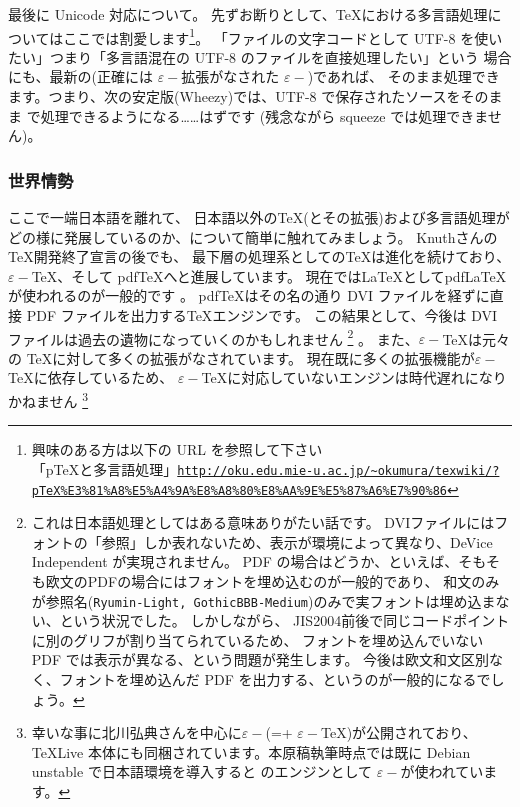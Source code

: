 \documentclass[mingoth,a4paper]{jsarticle}
\begin{document}
最後に Unicode 対応について。
先ずお断りとして、{\TeX}における多言語処理についてはここでは割愛します\footnote{
  興味のある方は以下の URL を参照して下さい\\
  「pTeXと多言語処理」{\tt{\url{http://oku.edu.mie-u.ac.jp/~okumura/texwiki/?pTeX\%E3\%81\%A8\%E5\%A4\%9A\%E8\%A8\%80\%E8\%AA\%9E\%E5\%87\%A6\%E7\%90\%86}}}
}。
%
「ファイルの文字コードとして UTF-8 を使いたい」つまり「多言語混在の UTF-8 のファイルを直接処理したい」という
場合にも、最新の{\pLaTeX}(正確には $\varepsilon-$拡張がなされた $\varepsilon-$\pTeX)であれば、
そのまま処理できます。つまり、次の安定版(Wheezy)では、UTF-8 で保存されたソースをそのまま \pLaTeX で処理できるようになる……はずです%
(残念ながら squeeze では処理できません)。

\subsubsection{世界情勢}

ここで一端日本語を離れて、
日本語以外の{\TeX}(とその拡張)および多言語処理がどの様に発展しているのか、について簡単に触れてみましょう。
%
Knuthさんの{\TeX}開発終了宣言の後でも、
最下層の処理系としての{\TeX}は進化を続けており、$\varepsilon-$\TeX、そして pdf\TeX へと進展しています。
現在では{\LaTeX}として{pdf\LaTeX}が使われるのが一般的です
。
pdf{\TeX}はその名の通り DVI ファイルを経ずに直接 PDF ファイルを出力する{\TeX}エンジンです。
この結果として、今後は DVI ファイルは過去の遺物になっていくのかもしれません
\footnote{
  これは日本語処理としてはある意味ありがたい話です。
  DVIファイルにはフォントの「参照」しか表れないため、表示が環境によって異なり、DeVice Independent が実現されません。
  PDF の場合はどうか、といえば、そもそも欧文のPDFの場合にはフォントを埋め込むのが一般的であり、
  和文のみが参照名({\tt{Ryumin-Light, GothicBBB-Medium}})のみで実フォントは埋め込まない、という状況でした。
  しかしながら、
  JIS2004前後で同じコードポイントに別のグリフが割り当てられているため、
  フォントを埋め込んでいない PDF では表示が異なる、という問題が発生します。
  今後は欧文和文区別なく、フォントを埋め込んだ PDF を出力する、というのが一般的になるでしょう。
}
。
また、$\varepsilon-$\TeX は元々の \TeX に対して多くの拡張がなされています。
現在既に多くの拡張機能が$\varepsilon-${\TeX}に依存しているため、
$\varepsilon-${\TeX}に対応していないエンジンは時代遅れになりかねません%
\footnote{%
  幸いな事に北川弘典さんを中心に$\varepsilon-$\pTeX(=\pTeX + $\varepsilon-$TeX)が公開されており、
  TeXLive 本体にも同梱されています。本原稿執筆時点では既に
  Debian unstable で日本語環境を導入すると \pLaTeX のエンジンとして $\varepsilon-$\pTeX が使われています。
}
\end{document}
